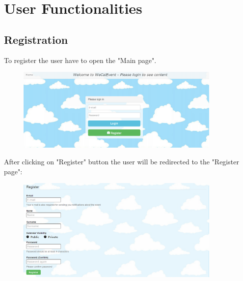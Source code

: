 \newpage
\section{User Functionalities}
\subsection{Registration}
\par \qquad To register the user have to open the "Main page".
\begin{figure}[tbh]
  \begin{center}
    \includegraphics[width=100mm]{mainp}
  \end{center}
\end{figure}

\par After clicking on "Register" button the user will be redirected to the "Register page":
\begin{figure}[tbh]
  \begin{center}
    \includegraphics[width=100mm]{regp}
  \end{center}
\end{figure}

